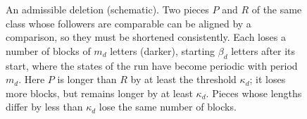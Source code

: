 \begin{figure}[!b]
\caption{An admissible deletion (schematic). Two pieces $P$ and $R$ of the
same class whose followers are comparable can be aligned by a comparison, so
they must be shortened consistently. Each loses a number of blocks of $m_d$
letters (darker), starting $\beta_d$ letters after its start, where the states
of the run have become periodic with period $m_d$. Here $P$ is longer than
$R$ by at least the threshold $\kappa_d$; it loses more blocks, but remains longer
by at least $\kappa_d$. Pieces whose lengths differ by less than $\kappa_d$
lose the same number of blocks.}
\label{fig:compression}
\end{figure}
